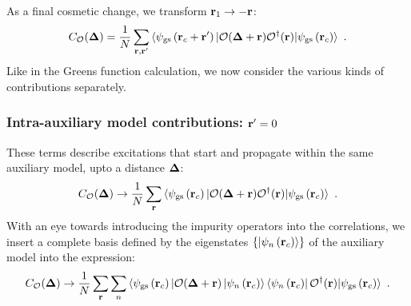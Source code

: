 \documentclass[reprint,hidelinks,onecolumn]{revtex4-2}
\begin{document}
As a final cosmetic change, we transform \({\bf r}_1 \to -{\bf r}\):
\begin{equation}\begin{aligned}
	C_{\mathcal{O}}({\bf \Delta}) = \frac{1}{N}\sum_{{\bf r},{\bf r}^\prime}\braket{\psi_\text{gs}\left({\bf r}_c + {\bf r}^\prime\right) | \mathcal{O}({\bf \Delta} + {\bf r}) \mathcal{O}^\dagger({\bf r}) | \psi_\text{gs}\left({\bf r}_c\right)}~.
\end{aligned}\end{equation}
Like in the Greens function calculation, we now consider the various kinds of contributions separately.

\subsubsection{Intra-auxiliary model contributions: \({\bf r}^\prime = 0\)}
These terms describe excitations that start and propagate within the same auxiliary model, upto a distance \({\bf \Delta}\):
\begin{equation}\begin{aligned}
	C_{\mathcal{O}}({\bf \Delta}) \to \frac{1}{N}\sum_{{\bf r}}\braket{\psi_\text{gs}\left({\bf r}_c\right) | \mathcal{O}({\bf \Delta} + {\bf r})\mathcal{O}^\dagger({\bf r}) | \psi_\text{gs}\left({\bf r}_c\right)}~.
\end{aligned}\end{equation}
With an eye towards introducing the impurity operators into the correlations, we insert a complete basis defined by the eigenstates \(\left\{\ket{\psi_n\left({\bf r}_c\right)}\right\} \) of the auxiliary model into the expression:
\begin{equation}\begin{aligned}
	C_{\mathcal{O}}({\bf \Delta}) \to \frac{1}{N}\sum_{{\bf r}}\sum_{n}\braket{\psi_\text{gs}\left({\bf r}_c\right) | \mathcal{O}({\bf \Delta} + {\bf r}) \ket{\psi_n\left({\bf r}_c\right)}\bra{\psi_n\left({\bf r}_c\right)} \mathcal{O}^\dagger({\bf r}) | \psi_\text{gs}\left({\bf r}_c\right)}~.
\end{aligned}\end{equation}
\end{document}

